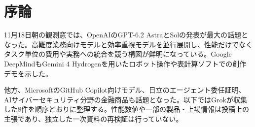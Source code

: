 \section{序論}
11月18日朝の観測窓では、OpenAIのGPT-6.2 AstraとSolの発表が最大の話題となった。高難度業務向けモデルと効率重視モデルを並行展開し、性能だけでなくタスク単位の費用や実務への統合を競う構図が鮮明になっている。Google DeepMindもGemini 4 Hydrogenを用いたロボット操作や表計算ソフトでの創作デモを示した。

他方、MicrosoftのGitHub Copilot向けモデル、日立のエージェント委任証明、AIサイバーセキュリティ分野の金融商品も話題となった。以下ではGrokが収集した8件を順序どおりに整理する。性能数値や一部の製品・上場情報は投稿上の主張であり、独立した一次資料の再検証は行っていない。